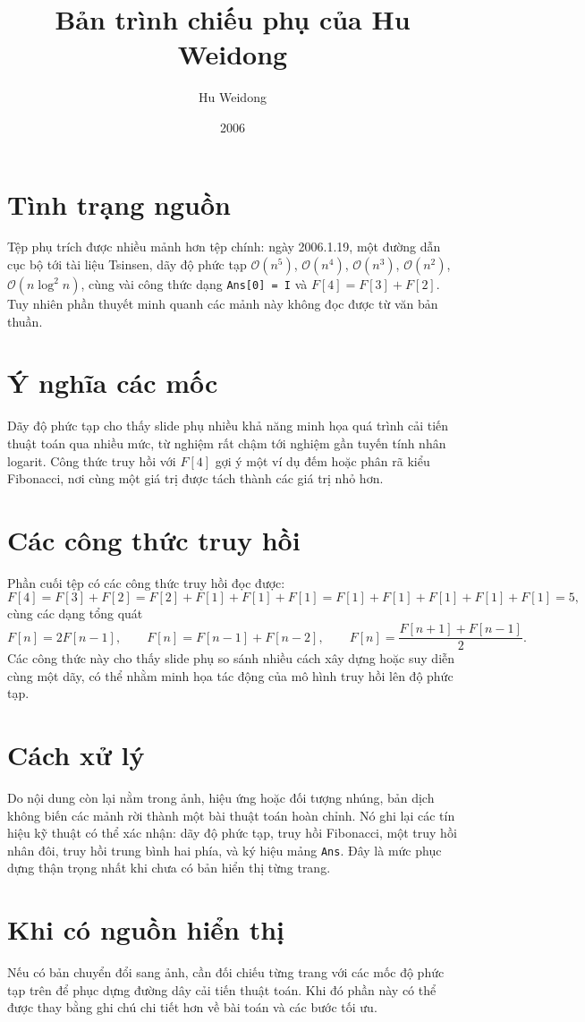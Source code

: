 \documentclass[11pt]{article}
\title{Bản trình chiếu phụ của Hu Weidong}
\author{Hu Weidong}
\date{2006}
\newcommand{\Oh}{\mathcal{O}}
\begin{document}
\maketitle


\section{Tình trạng nguồn}

Tệp phụ trích được nhiều mảnh hơn tệp chính: ngày 2006.1.19, một đường dẫn cục
bộ tới tài liệu Tsinsen, dãy độ phức tạp \(\Oh(n^5)\), \(\Oh(n^4)\),
\(\Oh(n^3)\), \(\Oh(n^2)\), \(\Oh(n\log^2 n)\), cùng vài công thức dạng
\texttt{Ans[0] = I} và \(F[4]=F[3]+F[2]\). Tuy nhiên phần thuyết minh quanh
các mảnh này không đọc được từ văn bản thuần.

\section{Ý nghĩa các mốc}

Dãy độ phức tạp cho thấy slide phụ nhiều khả năng minh họa quá trình cải tiến
thuật toán qua nhiều mức, từ nghiệm rất chậm tới nghiệm gần tuyến tính nhân
logarit. Công thức truy hồi với \(F[4]\) gợi ý một ví dụ đếm hoặc phân rã
kiểu Fibonacci, nơi cùng một giá trị được tách thành các giá trị nhỏ hơn.

\section{Các công thức truy hồi}

Phần cuối tệp có các công thức truy hồi đọc được:
\[
  F[4]=F[3]+F[2]=F[2]+F[1]+F[1]+F[1]
  =F[1]+F[1]+F[1]+F[1]+F[1]=5,
\]
cùng các dạng tổng quát
\[
  F[n]=2F[n-1],\qquad
  F[n]=F[n-1]+F[n-2],\qquad
  F[n]=\frac{F[n+1]+F[n-1]}2.
\]
Các công thức này cho thấy slide phụ so sánh nhiều cách xây dựng hoặc suy
diễn cùng một dãy, có thể nhằm minh họa tác động của mô hình truy hồi lên độ
phức tạp.

\section{Cách xử lý}

Do nội dung còn lại nằm trong ảnh, hiệu ứng hoặc đối tượng nhúng, bản dịch
không biến các mảnh rời thành một bài thuật toán hoàn chỉnh. Nó ghi lại các
tín hiệu kỹ thuật có thể xác nhận: dãy độ phức tạp, truy hồi Fibonacci, một
truy hồi nhân đôi, truy hồi trung bình hai phía, và ký hiệu mảng \texttt{Ans}.
Đây là mức phục dựng thận trọng nhất khi chưa có bản hiển thị từng trang.

\section{Khi có nguồn hiển thị}

Nếu có bản chuyển đổi sang ảnh, cần đối chiếu từng trang với các mốc độ phức
tạp trên để phục dựng đường dây cải tiến thuật toán. Khi đó phần này có thể
được thay bằng ghi chú chi tiết hơn về bài toán và các bước tối ưu.
\end{document}
